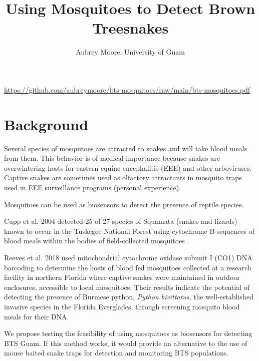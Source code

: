 \documentclass[12pt,letterpaper,english,bibliography=totocnumbered,abstract=on]{scrartcl}
\begin{document}
\titlehead{RESEARCH IDEA}
\title{Using Mosquitoes to Detect Brown Treesnakes}
\author{Aubrey Moore, University of Guam}
\maketitle

\begin{footnotesize}
\url{https://github.com/aubreymoore/bts-mosquitoes/raw/main/bts-mosquitoes.pdf}
\end{footnotesize}


\tableofcontents{}

\newpage
\listoftodos

\newpage


\section{Background} 

Several species of mosquitoes are attracted to snakes and will take blood meals from them. This behavior is of medical importance because snakes are overwintering hosts for eastern equine encephalitis (EEE) and other arboviruses. Captive snakes are sometimes used as olfactory attractants in mosquito traps used in EEE surveillance programs (personal experience).

Mosquitoes can be used as biosensors to detect the presence of reptile species. 

Cupp et al. 2004 detected 25 of 27 species of Squamata (snakes and lizards) known to occur in the Tuskegee National Forest using cytochrome B sequences of blood meals within the bodies of field-collected mosquitoes \cite{cuppIDENTIFICATIONREPTILIANAMPHIBIAN2004}. 

Reeves et al. 2018 \cite{reevesInteractionsInvasiveBurmese2018} used mitochondrial cytochrome oxidase subunit I (CO1) DNA barcoding to determine the hosts of blood fed mosquitoes collected at a research facility in northern Florida where captive snakes were maintained in outdoor enclosures, accessible to local mosquitoes.  Their results indicate the potential of detecting the presence of Burmese python, \textit{Python bivittatus}, the well-established invasive species in the Florida Everglades, through screening mosquito blood meals for their DNA.

We propose testing the feasibility of using mosquitoes as biosensors for detecting BTS Guam. If this method works, it would provide an alternative to the use of mouse baited snake traps for detection and monitoring BTS populations.
\end{document}
